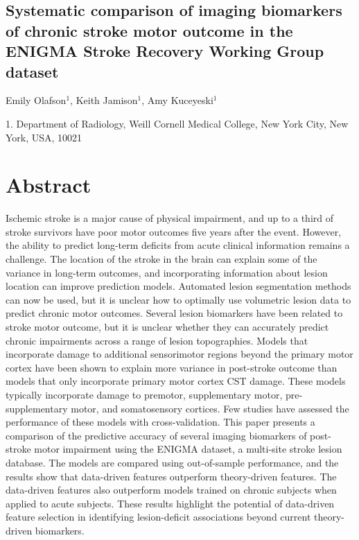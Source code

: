 \documentclass[10pt]{article}
\begin{document}
 

\begin{center}
{\large \section*{Systematic comparison of imaging biomarkers of chronic stroke motor outcome in the ENIGMA Stroke Recovery Working Group dataset}}
\end{center}

\begin{center}
Emily Olafson$^1$, Keith Jamison$^1$, Amy Kuceyeski$^1$
\end{center}

    1. \textmd{Department of Radiology, Weill Cornell Medical College, New York City, New York, USA, 10021} 


\section{Abstract}
Ischemic stroke is a major cause of physical impairment, and up to a third of stroke survivors have poor motor outcomes five years after the event. However, the ability to predict long-term deficits from acute clinical information remains a challenge. The location of the stroke in the brain can explain some of the variance in long-term outcomes, and incorporating information about lesion location can improve prediction models. Automated lesion segmentation methods can now be used, but it is unclear how to optimally use volumetric lesion data to predict chronic motor outcomes. Several lesion biomarkers have been related to stroke motor outcome, but it is unclear whether they can accurately predict chronic impairments across a range of lesion topographies. Models that incorporate damage to additional sensorimotor regions beyond the primary motor cortex have been shown to explain more variance in post-stroke outcome than models that only incorporate primary motor cortex CST damage. These models typically incorporate damage to premotor, supplementary motor, pre-supplementary motor, and somatosensory cortices. Few studies have assessed the performance of these models with cross-validation. This paper presents a comparison of the predictive accuracy of several imaging biomarkers of post-stroke motor impairment using the ENIGMA dataset, a multi-site stroke lesion database. The models are compared using out-of-sample performance, and the results show that data-driven features outperform theory-driven features. The data-driven features also outperform models trained on chronic subjects when applied to acute subjects. These results highlight the potential of data-driven feature selection in identifying lesion-deficit associations beyond current theory-driven biomarkers.
\end{document}
